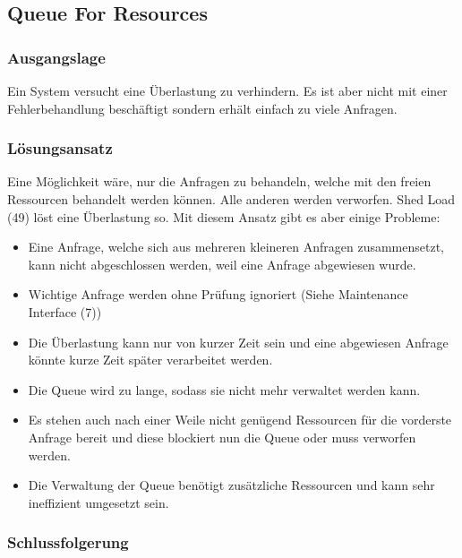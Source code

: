 \subsection{Queue For Resources}

\subsubsection*{Ausgangslage}

Ein System versucht eine Überlastung zu verhindern. Es ist aber nicht mit einer Fehlerbehandlung beschäftigt sondern erhält einfach zu viele Anfragen.

\subsubsection*{Lösungsansatz}

Eine Möglichkeit wäre, nur die Anfragen zu behandeln, welche mit den freien Ressourcen behandelt werden können. Alle anderen werden verworfen. Shed Load (49) löst eine Überlastung so. Mit diesem Ansatz gibt es aber einige Probleme:
\begin{itemize}
	\item Eine Anfrage, welche sich aus mehreren kleineren Anfragen zusammensetzt, kann nicht abgeschlossen werden, weil eine Anfrage abgewiesen wurde.
	\item Wichtige Anfrage werden ohne Prüfung ignoriert (Siehe Maintenance Interface (7))
	\item Die Überlastung kann nur von kurzer Zeit sein und eine abgewiesen Anfrage könnte kurze Zeit später verarbeitet werden.
\end{itemize}

\begin{itemize}
	\item Die Queue wird zu lange, sodass sie nicht mehr verwaltet werden kann.
	\item Es stehen auch nach einer Weile nicht genügend Ressourcen für die vorderste Anfrage bereit und diese blockiert nun die Queue oder muss verworfen werden.
	\item Die Verwaltung der Queue benötigt zusätzliche Ressourcen und kann sehr ineffizient umgesetzt sein.
\end{itemize}

\subsubsection*{Schlussfolgerung}

